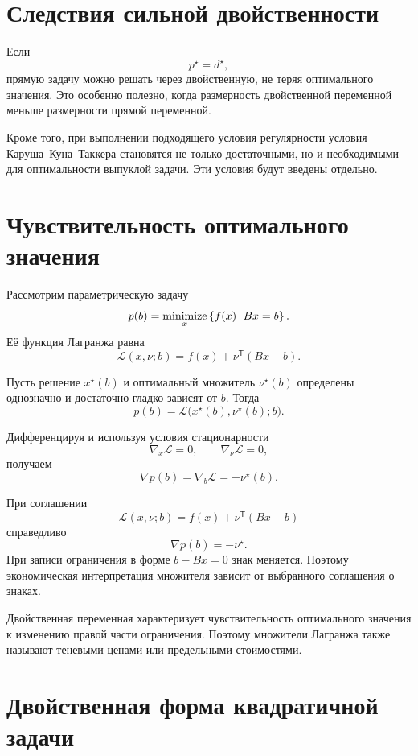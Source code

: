 \section{Следствия сильной двойственности}

Если
\[
    p^\star=d^\star,
\]
прямую задачу можно решать через двойственную, не теряя оптимального
значения. Это особенно полезно, когда размерность двойственной
переменной меньше размерности прямой переменной.

Кроме того, при выполнении подходящего условия регулярности условия
Каруша--Куна--Таккера становятся не только достаточными, но и
необходимыми для оптимальности выпуклой задачи. Эти условия будут
введены отдельно.

\section{Чувствительность оптимального значения}

Рассмотрим параметрическую задачу
\[
    p(b)
    =
    \operatorname*{minimize}_x
    \left\{
        f(x)
        \,\middle|\,
        Bx=b
    \right\}.
\]
Её функция Лагранжа равна
\[
    \mathcal L(x,\nu;b)
    =
    f(x)+\nu^{\mathsf T}(Bx-b).
\]

Пусть решение \(x^\star(b)\) и оптимальный множитель
\(\nu^\star(b)\) определены однозначно и достаточно гладко зависят
от \(b\). Тогда
\[
    p(b)
    =
    \mathcal L
    \bigl(
        x^\star(b),
        \nu^\star(b);
        b
    \bigr).
\]

Дифференцируя и используя условия стационарности
\[
    \nabla_x\mathcal L=0,
    \qquad
    \nabla_\nu\mathcal L=0,
\]
получаем
\[
    \nabla p(b)
    =
    \nabla_b\mathcal L
    =
    -\nu^\star(b).
\]

\begin{remark}
При соглашении
\[
    \mathcal L(x,\nu;b)
    =
    f(x)+\nu^{\mathsf T}(Bx-b)
\]
справедливо
\[
    \nabla p(b)=-\nu^\star.
\]
При записи ограничения в форме \(b-Bx=0\) знак меняется. Поэтому
экономическая интерпретация множителя зависит от выбранного
соглашения о знаках.
\end{remark}

Двойственная переменная характеризует чувствительность оптимального
значения к изменению правой части ограничения. Поэтому множители
Лагранжа также называют теневыми ценами или предельными стоимостями.

\section{Двойственная форма квадратичной задачи}

